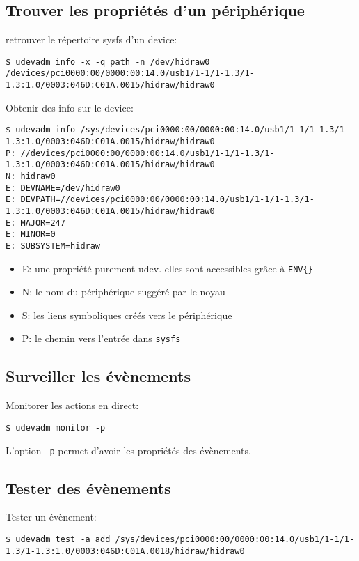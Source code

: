 \documentclass[compress,aspectratio=169]{beamer}
\begin{document}
\subsection{Trouver les propriétés d'un périphérique}
\begin{frame}[fragile]
retrouver le répertoire sysfs d'un device:
\begin{lstlisting}[style=shell,basicstyle=\tiny\ttfamily\color{white}]
$ udevadm info -x -q path -n /dev/hidraw0
/devices/pci0000:00/0000:00:14.0/usb1/1-1/1-1.3/1-1.3:1.0/0003:046D:C01A.0015/hidraw/hidraw0
\end{lstlisting}
Obtenir des info sur le device:
\begin{lstlisting}[style=shell,basicstyle=\tiny\ttfamily\color{white}]
$ udevadm info /sys/devices/pci0000:00/0000:00:14.0/usb1/1-1/1-1.3/1-1.3:1.0/0003:046D:C01A.0015/hidraw/hidraw0
P: //devices/pci0000:00/0000:00:14.0/usb1/1-1/1-1.3/1-1.3:1.0/0003:046D:C01A.0015/hidraw/hidraw0
N: hidraw0
E: DEVNAME=/dev/hidraw0
E: DEVPATH=//devices/pci0000:00/0000:00:14.0/usb1/1-1/1-1.3/1-1.3:1.0/0003:046D:C01A.0015/hidraw/hidraw0
E: MAJOR=247
E: MINOR=0
E: SUBSYSTEM=hidraw
\end{lstlisting}
\begin{itemize}
    \item E: une propriété purement udev. elles sont accessibles grâce à \texttt{ENV\{\}}
    \item N: le nom du périphérique suggéré par le noyau
    \item S: les liens symboliques créés vers le périphérique
    \item P: le chemin vers l’entrée dans \texttt{sysfs}
\end{itemize}
\end{frame}

\subsection{Surveiller les évènements}
\begin{frame}[fragile]
Monitorer les actions en direct:
\begin{lstlisting}[style=shell]
$ udevadm monitor -p
\end{lstlisting}
L'option \texttt{-p} permet d'avoir les propriétés des évènements.
\end{frame}

\subsection{Tester des évènements}
\begin{frame}[fragile]
Tester un évènement:
\begin{lstlisting}[style=shell]
$ udevadm test -a add /sys/devices/pci0000:00/0000:00:14.0/usb1/1-1/1-1.3/1-1.3:1.0/0003:046D:C01A.0018/hidraw/hidraw0
\end{lstlisting}
\end{frame}
\end{document}
